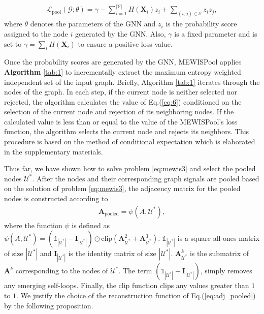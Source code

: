 \documentclass{article}
\begin{document}
\begin{gather}
	\label{eq:6}
	\mathcal{L}_{\textrm{pool}}(\mathcal{G};\theta) = \gamma - \sum_{i=1}^{|\mathcal{V}|} H(\mathbf{X}_i)z_i + \sum_{(i, j) \in \mathcal{E}}z_iz_j,
\end{gather}
where $\theta$ denotes the parameters of the GNN and $z_i$ is the probability score assigned to the node $i$ generated by the GNN. Also, $\gamma$ is a fixed parameter and is set to $\gamma = \sum_{i}H(\mathbf{X}_i)$ to ensure a positive loss value.

Once the probability scores are generated by the GNN, MEWISPool applies \textbf{Algorithm} \ref{tab:1} to incrementally extract the maximum entropy weighted independent set of the input graph. Briefly, Algorithm \ref{tab:1} iterates through the nodes of the graph. In each step, if the current node is neither selected nor rejected, the algorithm calculates the value of Eq.(\ref{eq:6}) conditioned on the selection of the current node and rejection of its neighboring nodes. If the calculated value is less than or equal to the value of the MEWISPool's loss function, the algorithm selects the current node and rejects its neighbors. This procedure is based on the method of conditional expectation which is elaborated in the supplementary materials.

Thus far, we have shown how to solve problem \ref{eq:mewis3} and select the pooled nodes $\mathcal{U}^*$. After the nodes and their corresponding graph signals are pooled based on the solution of problem \ref{eq:mewis3}, the adjacency matrix for the pooled nodes is constructed according to
\begin{gather}
	\label{eq:adj_pooled}
	\mathbf{A}_{\textrm{pooled}} = \psi(A, \mathcal{U}^*),
\end{gather}
where the function $\psi$ is defined as $\psi(A, \mathcal{U}^*) = (\mathbb{1}_{|\mathcal{U}^*|} - \mathbf{I}_{|\mathcal{U}^*|})\odot\textrm{clip}(\mathbf{A}^2_{\mathcal{U}^*} + \mathbf{A}^3_{\mathcal{U}^*})$. $\mathbb{1}_{|\mathcal{U}^*|}$ is a square all-ones matrix of size $|\mathcal{U}^*|$ and $\mathbf{I}_{|\mathcal{U}^*|}$ is the identity matrix of size $|\mathcal{U}^*|$. $\mathbf{A}^k_{\mathcal{U}^*}$ is the submatrix of $\mathbf{A}^k$ corresponding to the nodes of $\mathcal{U}^*$. The term $(\mathbb{1}_{|\mathcal{U}^*|} - \mathbf{I}_{|\mathcal{U}^*|})$, simply removes any emerging self-loops. Finally, the $\textrm{clip}$ function clips any values greater than $1$ to $1$. We justify the choice of the reconstruction function of Eq.(\ref{eq:adj_pooled}) by the following proposition.
\end{document}
